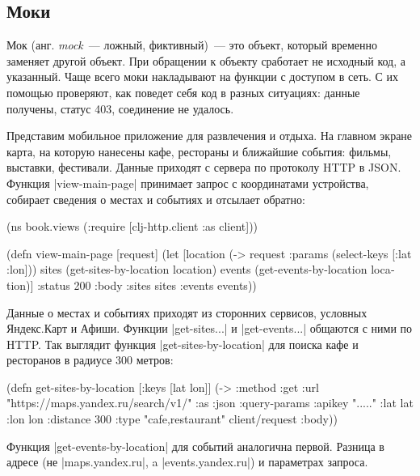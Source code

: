 \subsection{Моки}

Мок (анг. \emph{mock}~--- ложный, фиктивный)~--- это объект, который временно
заменяет другой объект. При обращении к объекту сработает не исходный код, а
указанный. Чаще всего моки накладывают на функции с доступом в сеть. С их
помощью проверяют, как поведет себя код в разных ситуациях: данные получены,
статус 403, соединение не удалось.

Представим мобильное приложение для развлечения и отдыха. На главном экране
карта, на которую нанесены кафе, рестораны и ближайшие события: фильмы,
выставки, фестивали. Данные приходят с сервера по протоколу HTTP в JSON. Функция
\spverb|view-main-page| принимает запрос с координатами устройства, собирает
сведения о местах и событиях и отсылает обратно:

\begin{english}
  \begin{clojure}
(ns book.views
  (:require [clj-http.client :as client]))

(defn view-main-page [request]
  (let [location (-> request :params (select-keys [:lat :lon]))
        sites (get-sites-by-location location)
        events (get-events-by-location location)]
    {:status 200
     :body {:sites sites :events events}}))
  \end{clojure}
\end{english}

Данные о местах и событиях приходят из сторонних сервисов, условных Яндекс.Карт
и Афиши. Функции \spverb|get-sites...| и \spverb|get-events...| общаются с ними
по HTTP. Так выглядит функция \spverb|get-sites-by-location| для поиска кафе и
ресторанов в радиусе 300 метров:

\begin{english}
  \begin{clojure}
(defn get-sites-by-location
  [{:keys [lat lon]}]
  (-> {:method :get
       :url "https://maps.yandex.ru/search/v1/"
       :as :json
       :query-params {:apikey "....."
                      :lat lat :lon lon :distance 300
                      :type "cafe,restaurant"}}
      client/request
      :body))
  \end{clojure}
\end{english}

Функция \spverb|get-events-by-location| для событий аналогична первой. Разница в
адресе (не \spverb|maps.yandex.ru|, a \spverb|events.yandex.ru|) и параметрах
запроса.

